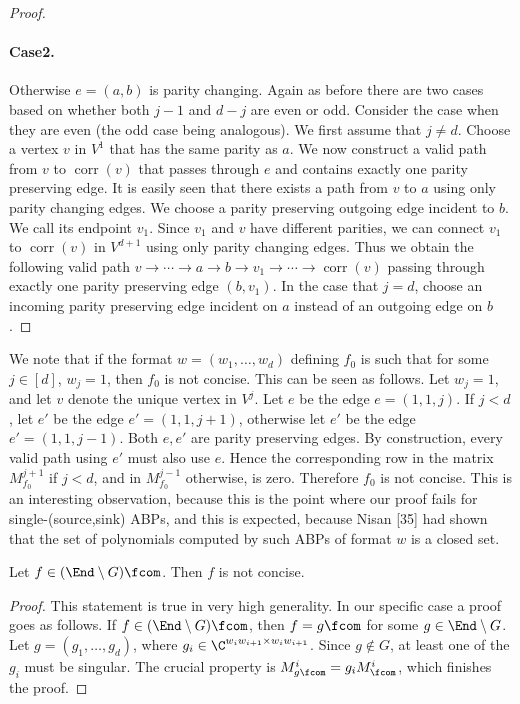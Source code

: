 \begin{proof}
\paragraph{Case2.} Otherwise $e=(a,b)$ is parity changing. Again as before there are two cases based on whether both $j-1$ and $d-j$ are even or odd. Consider the case when they are even (the odd case being analogous). We first assume that $j\ne d$. Choose a vertex $v$ in $V^1$ that has the same parity as $a$. We now construct a valid path from $v$ to $\operatorname{corr}(v)$ that passes through $e$ and contains exactly one parity preserving edge. It is easily seen that there exists a path from $v$ to $a$ using only parity changing edges. We choose a parity preserving outgoing edge incident to $b$. We call its endpoint $v_1$. Since $v_1$ and $v$ have different parities, we can connect $v_1$ to $\operatorname{corr}(v)$ in $V^{d+1}$ using only parity changing edges. Thus we obtain the following valid path $v\to\cdots\to a\to b\to v_1\to\cdots\to\operatorname{corr}(v)$ passing through exactly one parity preserving edge $(b,v_1)$. In the case that $j=d$, choose an incoming parity preserving edge incident on $a$ instead of an outgoing edge on $b$.
\end{proof}
\begin{remark}
We note that if the format $w=(w_1,\ldots,w_d)$ defining $f_0$ is such that for some $j\in[d]$, $w_j=1$, then $f_0$ is not concise. This can be seen as follows.
Let $w_j=1$, and let $v$ denote the unique vertex in $V^j$. Let $e$ be the edge $e=(1,1,j)$. If $j<d$, let $e'$ be the edge $e'=(1,1,j+1)$, otherwise let $e'$ be the edge $e'=(1,1,j-1)$. Both $e,e'$ are parity preserving edges. By construction, every valid path using $e'$ must also use $e$. Hence the corresponding row in the matrix $M^{j+1}_{f_0}$ if $j<d$, and in $M^{j-1}_{f_0}$ otherwise, is zero. Therefore $f_0$ is not concise.
This is an interesting observation, because this is the point where our proof fails for single-(source,sink) ABPs, and this is expected, because Nisan [35] had shown that the set of polynomials computed by such ABPs of format $w$ is a closed set.
\end{remark}
\begin{lemma}Let $f\in(\End\setminus G)\fcom$. Then $f$ is not concise.\end{lemma}
\begin{proof}
This statement is true in very high generality. In our specific case a proof goes as follows. If $f\in(\End\setminus G)\fcom$, then $f=g\fcom$ for some $g\in\End\setminus G$. Let $g=(g_1,\ldots,g_d)$, where $g_i\in\C^{w_iw_{i+1}\times w_iw_{i+1}}$. Since $g\notin G$, at least one of the $g_i$ must be singular. The crucial property is $M^i_{g\fcom}=g_iM^i_{\fcom}$, which finishes the proof.
\end{proof}
